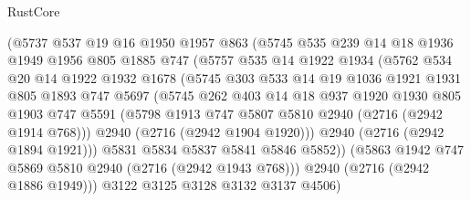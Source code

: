 \begin{lexlean}{RustCore}
\begin{coremodule}
                    (@5737
                      @537
                      @19
                      @16
                      @1950
                      @1957
                      @863
                      (@5745
                        @535
                        @239
                        @14
                        @18
                        @1936
                        @1949
                        @1956
                        @805
                        @1885
                        @747
                        (@5757
                          @535
                          @14
                          @1922
                          @1934
                          (@5762
                            @534
                            @20
                            @14
                            @1922
                            @1932
                            @1678
                            (@5745
                              @303
                              @533
                              @14
                              @19
                              @1036
                              @1921
                              @1931
                              @805
                              @1893
                              @747
                              @5697
                              (@5745
                                @262
                                @403
                                @14
                                @18
                                @937
                                @1920
                                @1930
                                @805
                                @1903
                                @747
                                @5591
                                (@5798 @1913 @747 @5807 @5810 @2940 (@2716 (@2942 @1914 @768)))
                                @2940
                                (@2716 (@2942 @1904 @1920)))
                              @2940
                              (@2716 (@2942 @1894 @1921)))
                            @5831
                            @5834
                            @5837
                            @5841
                            @5846
                            @5852))
                        (@5863 @1942 @747 @5869 @5810 @2940 (@2716 (@2942 @1943 @768)))
                        @2940
                        (@2716 (@2942 @1886 @1949)))
                      @3122
                      @3125
                      @3128
                      @3132
                      @3137
                      @4506)

\end{coremodule}
\end{lexlean}

